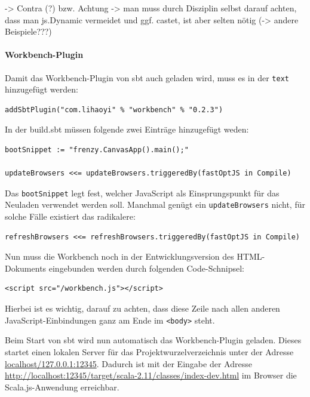 \documentclass[a4paper, 12pt, hidelinks, listof=totoc, listoftables=totoc, bibliography=totoc]{scrreprt}
\begin{document}
	-> Contra (?) bzw. Achtung ->  man muss durch Disziplin selbst darauf achten, dass man js.Dynamic vermeidet und ggf. castet, ist aber selten nötig (-> andere Beispiele???)





\paragraph{Workbench-Plugin}

Damit das Workbench-Plugin von sbt auch geladen wird, muss es in der \texttt{text} hinzugefügt werden:

\begin{lstlisting}
addSbtPlugin("com.lihaoyi" % "workbench" % "0.2.3")
\end{lstlisting}

In der build.sbt müssen folgende zwei Einträge hinzugefügt weden:
\begin{lstlisting}
bootSnippet := "frenzy.CanvasApp().main();"

updateBrowsers <<= updateBrowsers.triggeredBy(fastOptJS in Compile)
\end{lstlisting}

Das \texttt{bootSnippet} legt fest, welcher JavaScript als Einsprungspunkt für das Neuladen verwendet werden soll. Manchmal genügt ein \texttt{updateBrowsers} nicht, für solche Fälle existiert das radikalere:

\begin{lstlisting}
refreshBrowsers <<= refreshBrowsers.triggeredBy(fastOptJS in Compile)
\end{lstlisting}

Nun muss die Workbench noch in der Entwicklungsversion des HTML-Dokuments eingebunden werden durch folgenden Code-Schnipsel:

\begin{lstlisting}
<script src="/workbench.js"></script>
\end{lstlisting}

Hierbei ist es wichtig, darauf zu achten, dass diese Zeile nach allen anderen JavaScript-Einbindungen ganz am Ende im \texttt{<body>} steht.

Beim Start von sbt wird nun automatisch das Workbench-Plugin geladen. Dieses startet einen lokalen Server für das Projektwurzelverzeichnis unter der Adresse \url{localhost/127.0.0.1:12345}. Dadurch ist mit der Eingabe der Adresse \url{http://localhost:12345/target/scala-2.11/classes/index-dev.html} im Browser die Scala.js-Anwendung erreichbar.
\end{document}
